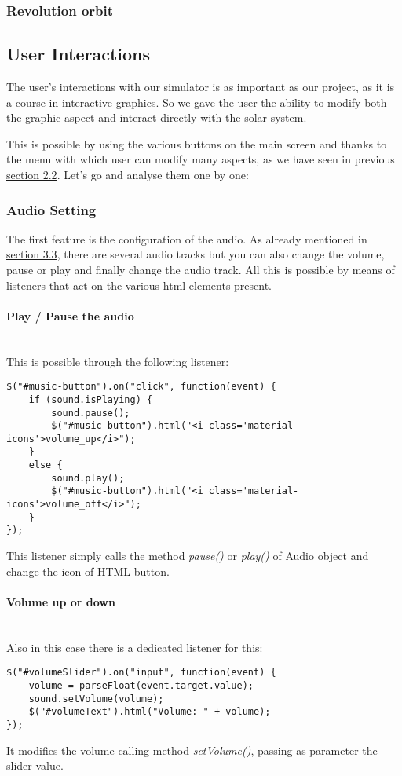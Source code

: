 \documentclass{article}
\begin{document}
\subsubsection{Revolution orbit}


\subsection{User Interactions}
The user's interactions with our simulator is as important as our project, as it is a course in interactive graphics. So we gave the user the ability to modify both the graphic aspect and interact directly with the solar system.
\par This is possible by using the various buttons on the main screen and thanks to the menu with which user can modify many aspects, as we have seen in previous \hyperref[menuoptions:section]{section 2.2}. Let's go and analyse them one by one:

\subsubsection{Audio Setting}
The first feature is the configuration of the audio. As already mentioned in \hyperref[music:section]{section 3.3}, there are several audio tracks but you can also change the volume, pause or play and finally change the audio track. All this is possible by means of listeners that act on the various html elements present.
\paragraph{Play / Pause the audio} \mbox{}\\
This is possible through the following listener:
\begin{lstlisting}
$("#music-button").on("click", function(event) {
	if (sound.isPlaying) {
		sound.pause();
		$("#music-button").html("<i class='material-icons'>volume_up</i>");
	}
	else {
		sound.play();
		$("#music-button").html("<i class='material-icons'>volume_off</i>");
	}
});
\end{lstlisting}
This listener simply calls the method \textit{pause()} or \textit{play()} of Audio object and change the icon of HTML button.
\paragraph{Volume up or down} \mbox{}\\
Also in this case there is a dedicated listener for this:
\begin{lstlisting}
$("#volumeSlider").on("input", function(event) {
	volume = parseFloat(event.target.value);
	sound.setVolume(volume);
	$("#volumeText").html("Volume: " + volume);
});
\end{lstlisting}
It modifies the volume calling method \textit{setVolume()}, passing as parameter the slider value.
\end{document}
